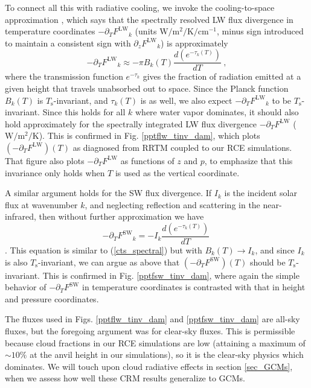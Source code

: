 \documentclass[10pt]{article}
\newcommand{\beqn}{\begin{equation}}
\newcommand{\eeqn}{\end{equation}}
\newcommand{\eqnref}[1]{(\ref{#1})}
\newcommand{\der}[2]{\ensuremath{\frac{d #1}{d #2}}}
\newcommand{\ppz}{\ensuremath{\partial_z}}
\newcommand{\ppt}{\ensuremath{\partial_T}}
\newcommand{\FLW}{\ensuremath{F^\mathrm{LW}}}
\newcommand{\FSW}{\ensuremath{F^\mathrm{SW}}}
\newcommand{\cminverse}{\ensuremath{\mathrm{cm^{-1}}}}
\newcommand{\tauk}{\ensuremath{\tau_k}}
\newcommand{\Wmsq}{\ensuremath{\mathrm{W/m^2}}}
\newcommand{\Ts}{\ensuremath{T_\mathrm{s}}}
\begin{document}
	To connect all this with radiative cooling, we invoke the cooling-to-space  approximation \citep[e.g.,][]{thomas2002, rodgers1966}, which says that the spectrally resolved LW flux divergence in temperature coordinates $-\ppt \FLW_k$ (units $\Wmsq/\mathrm{K}/\cminverse$, minus sign introduced to maintain a consistent sign with  $\ppz \FLW_k$) is approximately
	\beqn
		-\ppt \FLW_k \approx - \pi B_k(T) \frac{d (e^{-\tauk(T)})}{dT} \ ,
	\label{cts_spectral}
	\eeqn
where  the transmission function $e^{-\tauk}$ gives the fraction of radiation emitted at a given height that travels unabsorbed out to space. Since the Planck function $B_k(T)$ is \Ts-invariant, and $\tauk(T)$ is as well, we also expect $-\ppt \FLW_k$ to be \Ts-invariant. Since this holds for all $k$ where water vapor dominates, it should also hold approximately for the spectrally integrated LW flux divergence $-\ppt \FLW$ ($\Wmsq/\mathrm{K}$). This is confirmed in  Fig.  \ref{pptflw_tinv_dam}, which plots $(-\ppt \FLW)(T)$ as diagnosed from RRTM coupled to our  RCE simulations.  That figure also plots $-\ppt \FLW$ as functions of $z$ and $p$, to emphasize that this invariance only holds  when $T$ is used as the vertical coordinate.
	
	A similar argument holds for the SW flux divergence. If $I_k$ is the incident solar flux at wavenumber $k$, and  neglecting reflection and scattering in the  near-infrared, 
then without further approximation we have
	\beqn
		-\ppt \FSW_k = - I_k \der{(e^{-\tauk(T)})}{T}
		\
	\eeqn
\citep[c.f.][eqn. 9.26]{thomas2002}. This equation is similar to  \eqnref{cts_spectral} but with $B_k(T) \rightarrow I_k$, and since $I_k$ is also \Ts-invariant, we can argue as above that $(-\ppt \FSW)(T)$ should be \Ts-invariant. This is confirmed in Fig. \ref{pptfsw_tinv_dam}, where again the simple behavior of $-\ppt \FSW$ in temperature coordinates is contrasted with that in height and pressure coordinates.

The fluxes used in Figs.  \ref{pptflw_tinv_dam} and \ref{pptfsw_tinv_dam} are all-sky fluxes, but the foregoing argument was for clear-sky fluxes. This is permissible because cloud fractions in our RCE simulations are low (attaining a maximum of $\sim 10 \%$ at the anvil height in our simulations), so it is the clear-sky physics which dominates. We will touch upon cloud radiative effects in section \ref{sec_GCMs}, when we assess how well these CRM results generalize to GCMs.
 
		
\end{document}
